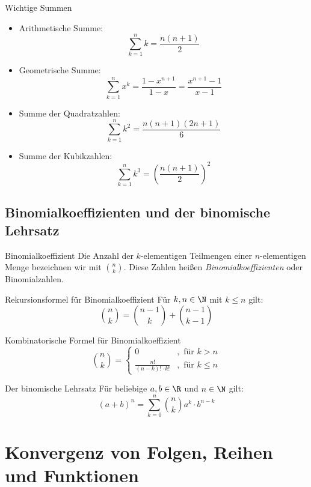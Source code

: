 \documentclass[german]{../spicker}
\begin{document}
\begin{bonus}{Wichtige Summen}
    \begin{itemize}
        \item Arithmetische Summe: $$\sum^n_{k=1} k = \frac{n(n+1)}{2}$$
        \item Geometrische Summe: $$\sum^n_{k=1} x^k = \frac{1-x^{n+1}}{1-x} = \frac{x^{n+1} - 1}{x-1}$$
        \item Summe der Quadratzahlen: $$\sum^n_{k=1} k^2 = \frac{n(n+1)(2n+1)}{6}$$
        \item Summe der Kubikzahlen: $$\sum^n_{k=1} k^3 = \left(\frac{n(n+1)}{2}\right)^2$$
    \end{itemize}
\end{bonus}

\subsection{Binomialkoeffizienten und der binomische Lehrsatz}

\begin{defi}{Binomialkoeffizient}
    Die Anzahl der $k$-elementigen Teilmengen einer $n$-elementigen Menge bezeichnen wir mit $\binom{n}{k}$.
    Diese Zahlen heißen \emph{Binomialkoeffizienten} oder Binomialzahlen.
\end{defi}

\begin{defi}{Rekursionsformel für Binomialkoeffizient}
    Für $k, n \in \N$ mit $k \leq n$ gilt:
    $$
        \binom{n}{k} = \binom{n-1}{k} + \binom{n-1}{k-1}
    $$
\end{defi}

\begin{defi}{Kombinatorische Formel für Binomialkoeffizient}
    $$
        \binom{n}{k} = \begin{cases}
            0                          & , \text{ für } k > n    \\
            \frac{n!}{(n-k)! \cdot k!} & , \text{ für } k \leq n
        \end{cases}
    $$
\end{defi}

\begin{defi}{Der binomische Lehrsatz}
    Für beliebige $a, b \in \R$ und $n \in \N$ gilt:
    $$
        (a+b)^n = \sum^n_{k=0} \binom{n}{k} a^k \cdot b^{n-k}
    $$
\end{defi}

\section{Konvergenz von Folgen, Reihen und Funktionen}
\end{document}
